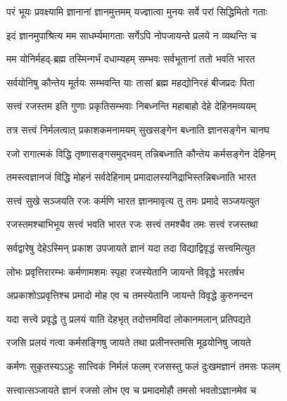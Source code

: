 \twolineshloka
{परं भूयः प्रवक्ष्यामि ज्ञानानां ज्ञानमुत्तमम्}
{यज्ज्ञात्वा मुनयः सर्वे परां सिद्धिमितो गताः}%

\twolineshloka
{इदं ज्ञानमुपाश्रित्य मम साधर्म्यमागताः}
{सर्गेऽपि नोपजायन्ते प्रलये न व्यथन्ति च}%

\twolineshloka
{मम योनिर्महद्-ब्रह्म तस्मिन्गर्भं दधाम्यहम्}
{सम्भवः सर्वभूतानां ततो भवति भारत}%

\twolineshloka
{सर्वयोनिषु कौन्तेय मूर्तयः सम्भवन्ति याः}
{तासां ब्रह्म महद्योनिरहं बीजप्रदः पिता}%

\twolineshloka
{सत्त्वं रजस्तम इति गुणाः प्रकृतिसम्भवाः}
{निबध्नन्ति महाबाहो देहे देहिनमव्ययम्}%

\twolineshloka
{तत्र सत्त्वं निर्मलत्वात् प्रकाशकमनामयम्}
{सुखसङ्गेन बध्नाति ज्ञानसङ्गेन चानघ}%

\twolineshloka
{रजो रागात्मकं विद्धि तृष्णासङ्गसमुद्भवम्}
{तन्निबध्नाति कौन्तेय कर्मसङ्गेन देहिनम्}%

\twolineshloka
{तमस्त्वज्ञानजं विद्धि मोहनं सर्वदेहिनाम्}
{प्रमादालस्यनिद्राभिस्तन्निबध्नाति भारत}%

\twolineshloka
{सत्त्वं सुखे सञ्जयति रजः कर्मणि भारत}
{ज्ञानमावृत्य तु तमः प्रमादे सञ्जयत्युत}%

\twolineshloka
{रजस्तमश्चाभिभूय सत्त्वं भवति भारत}
{रजः सत्त्वं तमश्चैव तमः सत्त्वं रजस्तथा}%

\twolineshloka
{सर्वद्वारेषु देहेऽस्मिन् प्रकाश उपजायते}
{ज्ञानं यदा तदा विद्याद्विवृद्धं सत्त्वमित्युत}%

\twolineshloka
{लोभः प्रवृत्तिरारम्भः कर्मणामशमः स्पृहा}
{रजस्येतानि जायन्ते विवृद्धे भरतर्षभ}%

\twolineshloka
{अप्रकाशोऽप्रवृत्तिश्च प्रमादो मोह एव च}
{तमस्येतानि जायन्ते विवृद्धे कुरुनन्दन}%

\twolineshloka
{यदा सत्त्वे प्रवृद्धे तु प्रलयं याति देहभृत्}
{तदोत्तमविदां लोकानमलान् प्रतिपद्यते}%

\twolineshloka
{रजसि प्रलयं गत्वा कर्मसङ्गिषु जायते}
{तथा प्रलीनस्तमसि मूढयोनिषु जायते}%

\twolineshloka
{कर्मणः सुकृतस्यऽऽहुः सात्त्विकं निर्मलं फलम्}
{रजसस्तु फलं दुःखमज्ञानं तमसः फलम्}%

\twolineshloka
{सत्त्वात्सञ्जायते ज्ञानं रजसो लोभ एव च}
{प्रमादमोहौ तमसो भवतोऽज्ञानमेव च}%

